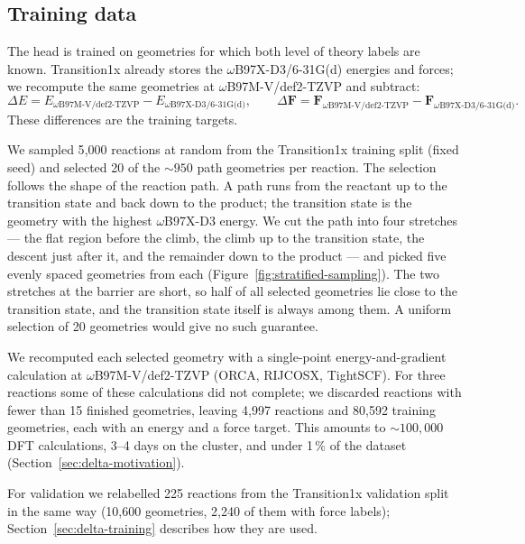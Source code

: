 \subsection{Training data}
\label{sec:delta-data}

The head is trained on geometries for which both level of theory labels are known.
Transition1x already stores the $\omega$B97X-D3/6-31G(d) energies and forces;
we recompute the same geometries at $\omega$B97M-V/def2-TZVP and subtract:
\begin{equation}
  \Delta E = E_{\omega\text{B97M-V/def2-TZVP}} - E_{\omega\text{B97X-D3/6-31G(d)}},
  \qquad
  \Delta \mathbf{F} = \mathbf{F}_{\omega\text{B97M-V/def2-TZVP}} - \mathbf{F}_{\omega\text{B97X-D3/6-31G(d)}}.
\end{equation}
These differences are the training targets.

We sampled 5{,}000 reactions at random from the Transition1x training split
(fixed seed) and selected 20 of the ${\sim}950$ path geometries per reaction.
The selection follows the shape of the reaction path. A path runs from the
reactant up to the transition state and back down to the product; the
transition state is the geometry with the highest $\omega$B97X-D3 energy. We
cut the path into four stretches --- the flat region before the climb, the
climb up to the transition state, the descent just after it, and the
remainder down to the product --- and picked five evenly spaced geometries
from each (Figure~\ref{fig:stratified-sampling}). The two stretches at the
barrier are short, so half of all selected geometries lie close to the
transition state, and the transition state itself is always among them. A
uniform selection of 20 geometries would give no such guarantee.

We recomputed each selected geometry with a single-point
energy-and-gradient calculation at $\omega$B97M-V/def2-TZVP (ORCA, RIJCOSX,
TightSCF). For three reactions some of these calculations did not complete; we
discarded reactions with fewer than 15 finished geometries, leaving 4{,}997
reactions and 80{,}592 training geometries, each with an energy and a force
target. This amounts to ${\sim}100{,}000$ DFT calculations, 3--4 days on the
cluster, and under 1\,\% of the dataset (Section~\ref{sec:delta-motivation}).

For validation we relabelled 225 reactions from the Transition1x validation
split in the same way (10{,}600 geometries, 2{,}240 of them with force
labels); Section~\ref{sec:delta-training} describes how they are used.

